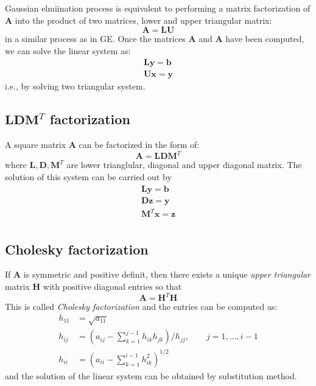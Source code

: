 \documentclass{article}
\begin{document}
Gaussian elmiination process is equivalent to performing a matrix factorization of $\mathbf{A}$
into the product of two matrices, lower and upper triangular matrix:
\[\mathbf{A} = \mathbf{L} \mathbf{U}\]
in a similar process as in GE. 
Once the matrices $\mathbf{A}$ and $\mathbf{A}$ have been computed, we can solve the linear 
system as:
\begin{align*}
    \mathbf{L}\mathbf{y} = \mathbf{b} \\
    \mathbf{U}\mathbf{x} = \mathbf{y}
\end{align*}
i.e., by solving two triangular system.

\subsection{$\mathbf{L} \mathbf{D} \mathbf{M}^T$ factorization}
A square matrix $\mathbf{A}$ can be factorized in the form of:
\begin{equation}
    \mathbf{A} = \mathbf{L} \mathbf{D} \mathbf{M}^T
\end{equation}
where $\mathbf{L}, \mathbf{D}, \mathbf{M}^T$ are lower trianglular, diagonal and 
upper diagonal matrix. The solution of this system can be carried out by 
\begin{align*}
    \mathbf{L}  \mathbf{y} = \mathbf{b} \\
    \mathbf{D}  \mathbf{z} = \mathbf{y} \\
    \mathbf{M}^T\mathbf{x} = \mathbf{z} \\
\end{align*}

\subsection{Cholesky factorization}
If $\mathbf{A}$ is symmetric and positive definit, then there exists a unique 
\emph{upper triangular} matrix $\mathbf{H}$ with positive diagonal entries so 
that 
\[ \mathbf{A} = \mathbf{H}^T \mathbf{H} \]
This is called \emph{Cholesky factorization} and the entries can be computed as:
\begin{align*}
    h_{11} &= \sqrt{a_{11}} \\
    h_{ij} &= \left( a_{ij} - \sum_{k=1}^{j-1} h_{ik}h_{jk} \right) / h_{jj}, \qquad j = 1,\dots,i-1 \\
    h_{ii} &= \left( a_{ii} - \sum_{k=1}^{i-1} h_{ik}^2 \right)^{1/2}
\end{align*}
and the solution of the linear system can be obtained by substitution method.
\end{document}
